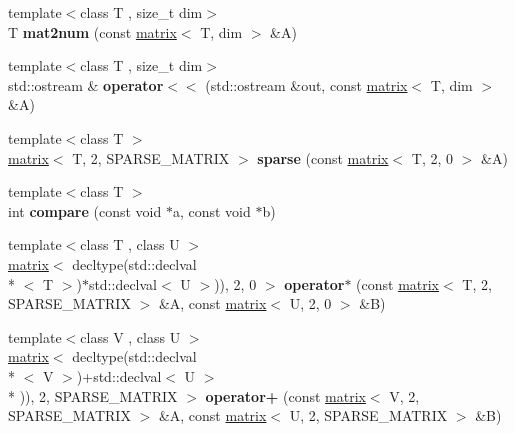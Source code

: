 \begin{DoxyCompactItemize}
\item 
\hypertarget{namespacekeycpp_ae75fa09ce73880f22e79334a51e74adf}{{\footnotesize template$<$class T , size\-\_\-t dim$>$ }\\T {\bfseries mat2num} (const \hyperlink{classkeycpp_1_1matrix}{matrix}$<$ T, dim $>$ \&A)}\label{namespacekeycpp_ae75fa09ce73880f22e79334a51e74adf}

\item 
\hypertarget{namespacekeycpp_abdc9a2ec3fa602bd1bad9cd9ea14038e}{{\footnotesize template$<$class T , size\-\_\-t dim$>$ }\\std\-::ostream \& {\bfseries operator$<$$<$} (std\-::ostream \&out, const \hyperlink{classkeycpp_1_1matrix}{matrix}$<$ T, dim $>$ \&A)}\label{namespacekeycpp_abdc9a2ec3fa602bd1bad9cd9ea14038e}

\item 
\hypertarget{namespacekeycpp_a7f1888d553533d5f314c332e184ccaed}{{\footnotesize template$<$class T $>$ }\\\hyperlink{classkeycpp_1_1matrix}{matrix}$<$ T, 2, S\-P\-A\-R\-S\-E\-\_\-\-M\-A\-T\-R\-I\-X $>$ {\bfseries sparse} (const \hyperlink{classkeycpp_1_1matrix}{matrix}$<$ T, 2, 0 $>$ \&A)}\label{namespacekeycpp_a7f1888d553533d5f314c332e184ccaed}

\item 
\hypertarget{namespacekeycpp_a7daba44de8578d8121d5607f9ba54a65}{{\footnotesize template$<$class T $>$ }\\int {\bfseries compare} (const void $\ast$a, const void $\ast$b)}\label{namespacekeycpp_a7daba44de8578d8121d5607f9ba54a65}

\item 
\hypertarget{namespacekeycpp_a526025f6146831819b33713787a37638}{{\footnotesize template$<$class T , class U $>$ }\\\hyperlink{classkeycpp_1_1matrix}{matrix}$<$ decltype(std\-::declval\\*
$<$ T $>$)$\ast$std\-::declval$<$ U $>$)), 2, 0 $>$ {\bfseries operator$\ast$} (const \hyperlink{classkeycpp_1_1matrix}{matrix}$<$ T, 2, S\-P\-A\-R\-S\-E\-\_\-\-M\-A\-T\-R\-I\-X $>$ \&A, const \hyperlink{classkeycpp_1_1matrix}{matrix}$<$ U, 2, 0 $>$ \&B)}\label{namespacekeycpp_a526025f6146831819b33713787a37638}

\item 
\hypertarget{namespacekeycpp_a9aafa7da7348137e3af28f89710e1ec1}{{\footnotesize template$<$class V , class U $>$ }\\\hyperlink{classkeycpp_1_1matrix}{matrix}$<$ decltype(std\-::declval\\*
$<$ V $>$)+std\-::declval$<$ U $>$\\*
)), 2, S\-P\-A\-R\-S\-E\-\_\-\-M\-A\-T\-R\-I\-X $>$ {\bfseries operator+} (const \hyperlink{classkeycpp_1_1matrix}{matrix}$<$ V, 2, S\-P\-A\-R\-S\-E\-\_\-\-M\-A\-T\-R\-I\-X $>$ \&A, const \hyperlink{classkeycpp_1_1matrix}{matrix}$<$ U, 2, S\-P\-A\-R\-S\-E\-\_\-\-M\-A\-T\-R\-I\-X $>$ \&B)}\label{namespacekeycpp_a9aafa7da7348137e3af28f89710e1ec1}


\end{DoxyCompactItemize}
